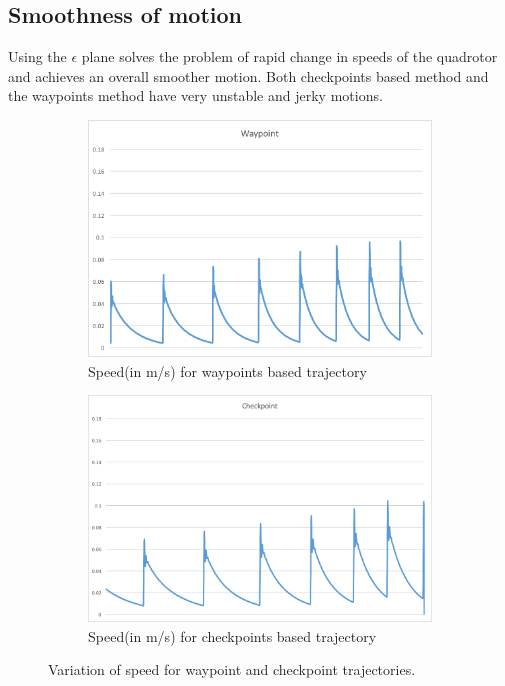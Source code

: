 \documentclass[hidelinks,BTech]{iitmdiss}
\begin{document}
\subsection{Smoothness of motion}
Using the $\epsilon$ plane solves the problem of rapid change in speeds of the quadrotor and achieves an overall smoother motion. Both checkpoints based method and the waypoints method have very unstable and jerky motions.
\begin{figure}[H]
  \centering
  \begin{subfigure}[t]{0.48\textwidth}
    \centering
      \includegraphics[width=\textwidth]{Waypoints_speed.png}
      \caption{Speed(in m/s) for waypoints based trajectory}
  \end{subfigure}
  \quad
  \begin{subfigure}[t]{0.48\textwidth}
    \centering
      \includegraphics[width=\textwidth]{Checkpoint_speed.png}
      \caption{Speed(in m/s) for checkpoints based trajectory}
  \end{subfigure}
  \caption{Variation of speed for waypoint and checkpoint trajectories.}
\end{figure}
\end{document}
